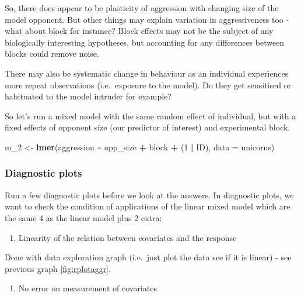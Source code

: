 \documentclass[
  12pt,
]{book}
\newenvironment{Shaded}{\begin{snugshade}}{\end{snugshade}}
\newcommand{\DataTypeTok}[1]{\textcolor[rgb]{0.13,0.29,0.53}{#1}}
\newcommand{\DecValTok}[1]{\textcolor[rgb]{0.00,0.00,0.81}{#1}}
\newcommand{\KeywordTok}[1]{\textcolor[rgb]{0.13,0.29,0.53}{\textbf{#1}}}
\newcommand{\NormalTok}[1]{#1}
\newcommand{\OperatorTok}[1]{\textcolor[rgb]{0.81,0.36,0.00}{\textbf{#1}}}
\newcommand{\StringTok}[1]{\textcolor[rgb]{0.31,0.60,0.02}{#1}}
\providecommand{\tightlist}{%
  \setlength{\itemsep}{0pt}\setlength{\parskip}{0pt}}
\begin{document}
So, there does appear to be plasticity of aggression with changing size of the model opponent. But other things may explain variation in aggressiveness too - what about block for instance? Block effects may not be the subject of any biologically interesting hypotheses, but accounting for any differences between blocks could remove noise.

There may also be systematic change in behaviour as an individual experiences more repeat observations (i.e.~exposure to the model). Do they get sensitised or habituated to the model intruder for example?

So let's run a mixed model with the same random effect of individual, but with a fixed effects of opponent size (our predictor of interest) and experimental block.

\begin{Shaded}
\begin{Highlighting}[]
\NormalTok{m\_}\DecValTok{2}\NormalTok{ \textless{}{-}}\StringTok{ }\KeywordTok{lmer}\NormalTok{(aggression }\OperatorTok{\textasciitilde{}}\StringTok{ }\NormalTok{opp\_size }\OperatorTok{+}\StringTok{ }\NormalTok{block }\OperatorTok{+}\StringTok{ }\NormalTok{(}\DecValTok{1} \OperatorTok{|}\StringTok{ }\NormalTok{ID), }\DataTypeTok{data =}\NormalTok{ unicorns)}
\end{Highlighting}
\end{Shaded}

\hypertarget{diagnostic-plots}{%
\subsubsection{Diagnostic plots}\label{diagnostic-plots}}

Run a few diagnostic plots before we look at the answers. In diagnostic plots, we want to check the condition of applications of the linear mixed model which are the same 4 as the linear model plus 2 extra:

\begin{enumerate}
\def\labelenumi{\arabic{enumi}.}
\tightlist
\item
  Linearity of the relation between covariates and the response
\end{enumerate}

Done with data exploration graph (i.e.~just plot the data see if it is linear)
- see previous graph \ref{fig:rplotaggr}.

\begin{enumerate}
\def\labelenumi{\arabic{enumi}.}
\setcounter{enumi}{1}
\tightlist
\item
  No error on measurement of covariates
\end{enumerate}
\end{document}
